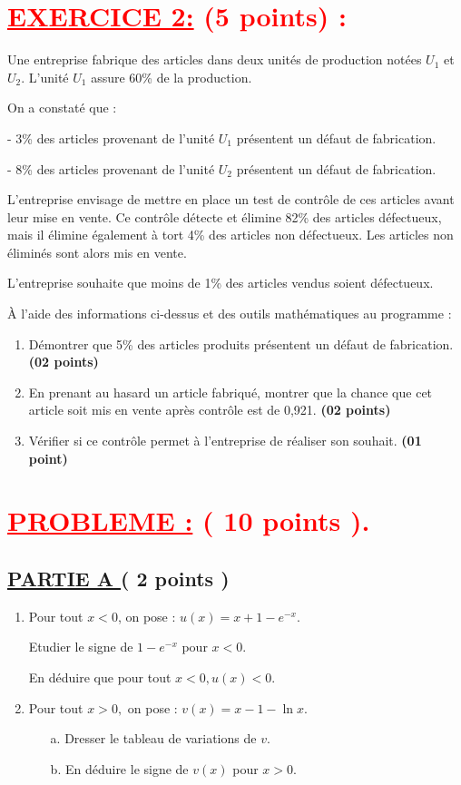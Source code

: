 \documentclass[12pt]{article}
\begin{document}
\section*{\textcolor{red}{\underline{EXERCICE 2:} (5 points) :}}

Une entreprise fabrique des articles dans deux unités de production notées \( U_1 \) et \( U_2 \). L’unité \( U_1 \) assure 60\% de la production.

On a constaté que :

- 3\% des articles provenant de l’unité \( U_1 \) présentent un défaut de fabrication.

- 8\% des articles provenant de l’unité \( U_2 \) présentent un défaut de fabrication.

L’entreprise envisage de mettre en place un test de contrôle de ces articles avant leur mise en vente. Ce contrôle détecte et élimine 82\% des articles défectueux, mais il élimine également à tort 4\% des articles non défectueux. Les articles non éliminés sont alors mis en vente.

L’entreprise souhaite que moins de 1\% des articles vendus soient défectueux.

À l’aide des informations ci-dessus et des outils mathématiques au programme :
\begin{enumerate}
    \item Démontrer que 5\% des articles produits présentent un défaut de fabrication. \textbf{(02 points)}
    \item En prenant au hasard un article fabriqué, montrer que la chance que cet article soit mis en vente après contrôle est de 0,921. \textbf{(02 points)}
    \item Vérifier si ce contrôle permet à l’entreprise de réaliser son souhait. \textbf{(01 point)}
\end{enumerate}
\section*{\textcolor{red}{\underline{PROBLEME :} ( 10 points ).}}
\subsection*{ \underline{PARTIE A } ( 2 points ) }
\begin{enumerate}
\item Pour tout $x < 0$, on pose : $u(x)=x+1-e^{-x}$.

Etudier le signe de $1-e^{-x}$ pour $x < 0$.

En déduire que pour tout $x < 0, u(x) < 0 $.

\item Pour tout $x > 0,$ on pose : $v(x)=x-1-\ln x$.
\begin{enumerate}
\item[a.] Dresser le tableau de variations de $v$.
\item[b.] En déduire le signe de $v(x)$ pour $x > 0 $.
\end{enumerate}
\end{enumerate}
\end{document}
